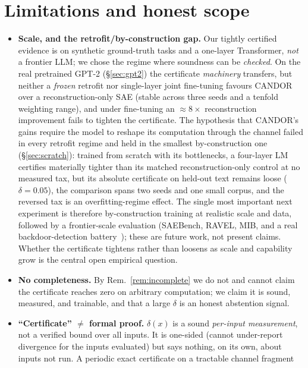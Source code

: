 \documentclass[11pt]{article}
\providecommand{\ftReconGain}{8}
\providecommand{\lmCandorDelta}{0.05}\providecommand{\lmCandorDeltaStd}{0.01}
\begin{document}
\section{Limitations and honest scope}
\label{sec:limits}
\begin{itemize}[leftmargin=1.4em,itemsep=1pt]
\item \textbf{Scale, and the retrofit/by-construction gap.} Our tightly certified
evidence is on synthetic ground-truth tasks and a one-layer Transformer, \emph{not} a
frontier LLM; we chose the regime where soundness can be \emph{checked}. On the real
pretrained GPT-2 (\S\ref{sec:gpt2}) the certificate \emph{machinery} transfers, but
neither a \emph{frozen} retrofit nor single-layer joint fine-tuning favours CANDOR
over a reconstruction-only SAE (stable across three seeds and a tenfold weighting
range), and under fine-tuning an $\approx\ftReconGain{}\times$ reconstruction
improvement fails to tighten the certificate. The hypothesis that CANDOR's gains
require the model to reshape its computation through the channel failed in every
retrofit regime and held in the smallest by-construction one (\S\ref{sec:scratch}):
trained from scratch with its bottlenecks, a four-layer LM certifies materially
tighter than its matched reconstruction-only control at no measured tax, but its
absolute certificate on held-out text remains loose ($\delta=\lmCandorDelta$), the
comparison spans two seeds and one small corpus, and the reversed tax is an
overfitting-regime effect. The single most important next experiment is therefore
by-construction training at realistic scale and data, followed by a frontier-scale
evaluation (SAEBench, RAVEL, MIB, and a real backdoor-detection
battery~\citep{karvonen2025saebench,huang2024ravel,mueller2025mib}); these are future
work, not present claims. Whether the certificate tightens rather than loosens as
scale and capability grow is the central open empirical question.
\item \textbf{No completeness.} By Rem.~\ref{rem:incomplete} we do not and cannot claim
the certificate reaches zero on arbitrary computation; we claim it is sound, measured,
and trainable, and that a large $\delta$ is an honest abstention signal.
\item \textbf{``Certificate'' $\neq$ formal proof.} $\delta(x)$ is a sound \emph{per-input
measurement}, not a verified bound over all inputs. It is one-sided (cannot under-report
divergence for the inputs evaluated) but says nothing, on its own, about inputs not run.
A periodic exact certificate on a tractable channel fragment~\citep{przybysz2023verifying}

\end{itemize}
\end{document}
